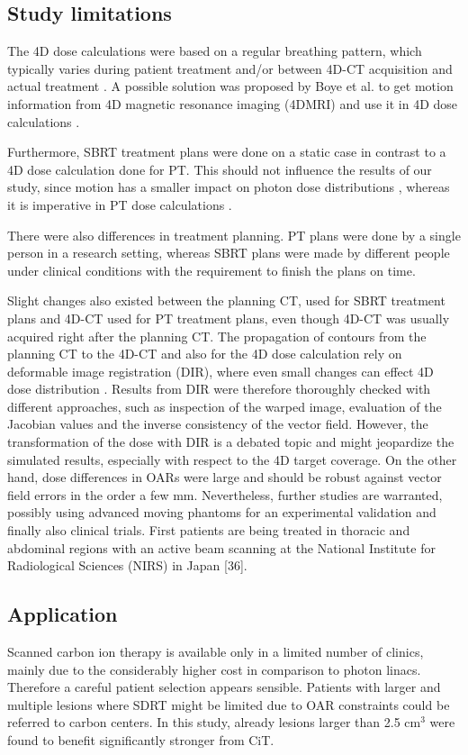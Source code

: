 \documentclass[type=dr, dr=rernat, acm$^3$entcolor=tud7b,colorbacktitle, bigchapter, openright, twoside, 12pt ]{tudthesis}
\begin{document}
\subsection{Study limitations}


The 4D dose calculations were based on a regular breathing pattern, which typically varies during patient treatment and/or between 4D-CT acquisition and actual treatment \cite{Verma2010, Malinowski2011}. A possible solution was proposed by Boye et al. to get motion information from 4D magnetic resonance imaging (4DMRI) and use it in 4D dose calculations \cite{Boye2013}.

Furthermore, SBRT treatment plans were done on a static case in contrast to a 4D dose calculation done for PT. This should not influence the results of our study, since motion has a smaller impact on photon dose distributions \cite{Zou2014}, whereas it is imperative in PT dose calculations \cite{Bert2011}. 

There were also differences in treatment planning. PT plans were done by a single person in a research setting, whereas SBRT plans were made by different people under clinical conditions with the requirement to finish the plans on time. 

Slight changes also existed between the planning CT, used for SBRT treatment plans and 4D-CT used for PT treatment plans, even though 4D-CT was usually acquired right after the planning CT. The propagation of contours from the planning CT to the 4D-CT and also for the 4D dose calculation rely on deformable image registration (DIR), where even small changes can effect 4D dose distribution \cite{Kashani2008}. Results from DIR were therefore thoroughly checked with different approaches, such as inspection of the warped image, evaluation of the Jacobian values and the inverse consistency of the vector field. However, the transformation of the dose with DIR is a debated topic and might jeopardize the simulated results, especially with respect to the 4D target coverage. On the other hand, dose differences in OARs were large and should be robust against vector field errors in the order a few mm. Nevertheless, further studies are warranted, possibly using advanced moving phantoms for an experimental validation \cite{Perrin2014} and finally also clinical trials. First patients are being treated in thoracic and abdominal regions with an active beam scanning at the National Institute for Radiological Sciences (NIRS) in Japan [36].



\subsection{Application}

Scanned carbon ion therapy is available only in a limited number of clinics, mainly due to the considerably higher cost in comparison to photon linacs.
Therefore a careful patient selection appears sensible. Patients with larger and multiple lesions where SDRT might be limited due to OAR constraints 
could be referred to carbon centers. In this study, already lesions larger than 2.5 cm$^3$ were found to benefit significantly stronger from CiT.



{}
\end{document}
